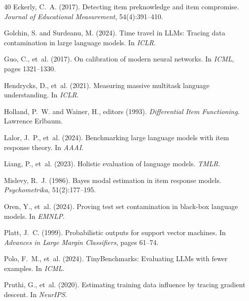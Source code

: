 \documentclass[11pt,a4paper]{article}
\begin{document}
\begin{thebibliography}{40}
Eckerly, C.~A. (2017).
\newblock Detecting item preknowledge and item compromise.
\newblock \emph{Journal of Educational Measurement}, 54(4):391--410.

Golchin, S. and Surdeanu, M. (2024).
\newblock Time travel in LLMs: Tracing data contamination in large language models.
\newblock In \emph{ICLR}.

Guo, C., et~al. (2017).
\newblock On calibration of modern neural networks.
\newblock In \emph{ICML}, pages 1321--1330.

Hendrycks, D., et~al. (2021).
\newblock Measuring massive multitask language understanding.
\newblock In \emph{ICLR}.

Holland, P.~W. and Wainer, H., editors (1993).
\newblock \emph{Differential Item Functioning}.
\newblock Lawrence Erlbaum.

Lalor, J.~P., et~al. (2024).
\newblock Benchmarking large language models with item response theory.
\newblock In \emph{AAAI}.

Liang, P., et~al. (2023).
\newblock Holistic evaluation of language models.
\newblock \emph{TMLR}.

Mislevy, R.~J. (1986).
\newblock Bayes modal estimation in item response models.
\newblock \emph{Psychometrika}, 51(2):177--195.

Oren, Y., et~al. (2024).
\newblock Proving test set contamination in black-box language models.
\newblock In \emph{EMNLP}.

Platt, J.~C. (1999).
\newblock Probabilistic outputs for support vector machines.
\newblock In \emph{Advances in Large Margin Classifiers}, pages 61--74.

Polo, F.~M., et~al. (2024).
\newblock TinyBenchmarks: Evaluating LLMs with fewer examples.
\newblock In \emph{ICML}.

Pruthi, G., et~al. (2020).
\newblock Estimating training data influence by tracing gradient descent.
\newblock In \emph{NeurIPS}.


\end{thebibliography}
\end{document}
